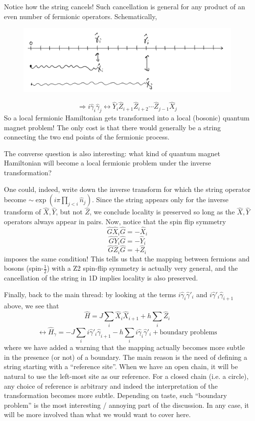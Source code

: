 Notice how the string cancels! Such cancellation is general for any product of an even number of fermionic operators. Schematically,
\begin{figure}[H]
    \centering
    \includegraphics[width=\textwidth]{jupyterbook/data/fig/lec26-fig02.png}
\end{figure}
\[ \Rightarrow i\hat{\gamma}_i\hat{\gamma}_j\leftrightarrow \hat{Y}_i\hat{Z}_{i+1}\hat{Z}_{i+2}\cdots \hat{Z}_{j-1}\hat{X}_j\]
So a local fermionic Hamiltonian gets transformed into a local (bosonic) quantum magnet problem! The only cost is that there would generally be a string connecting the two end points of the fermionic process.

The converse question is also interesting: what kind of quantum magnet Hamiltonian will become a local fermionic problem under the inverse transformation?

One could, indeed, write down the inverse transform for which the string operator become $\sim \exp \left( i\pi \prod_{j<i}{\hat{n}_j} \right)$. Since the string appears only for the inverse transform of $\hat{X},\hat{Y}$, but not $\hat{Z}$, we conclude locality is preserved so long as the $\hat{X},\hat{Y}$ operators always appear in pairs. Now, notice that the spin flip symmetry
\[ \hat{G}\hat{X}_i\hat{G}=-\hat{X}_i\]
\[ \hat{G}\hat{Y}_i\hat{G}=-\hat{Y}_i\]
\[ \hat{G}\hat{Z}_i\hat{G}=+\hat{Z}_i\]
imposes the same condition! This tells us that the mapping between fermions and bosons (spin-$\frac{1}{2}$) with a Z2 spin-flip symmetry is actually very general, and the cancellation of the string in 1D implies locality is also preserved.

Finally, back to the main thread: by looking at the terms $i\hat{\gamma}_i\hat{\gamma}'_i$ and $i\hat{\gamma}'_i\hat{\gamma}_{i+1}$ above, we see that
\[ \hat{H}=J\sum_i{\hat{X}_i\hat{X}_{i+1}}+h\sum_i{\hat{Z}_i}\]
\[ \leftrightarrow \hat{H}_{\gamma}=-J\sum_i{i\hat{\gamma}'_i\hat{\gamma}_{i+1}}-h\sum_i{i\hat{\gamma}_i\hat{\gamma}'_i} + \mathrm{boundary}\;\mathrm{problems}\]
where we have added a warning that the mapping actually becomes more subtle in the presence (or not) of a boundary. The main reason is the need of defining a string starting with a ``reference site''. When we have an open chain, it will be natural to use the left-most site as our reference. For a closed chain (i.e. a circle), any choice of reference is arbitrary and indeed the interpretation of the transformation becomes more subtle. Depending on taste, such ``boundary problem'' is the most interesting / annoying part of the discussion. In any case, it will be more involved than what we would want to cover here.

